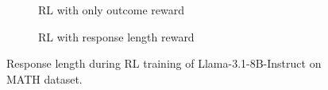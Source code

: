 \begin{figure}[h!]
    \centering
    \begin{subfigure}[b]{0.45\textwidth}
        \centering
        \caption{RL with only outcome reward}
        \label{fig:llama_wo_length_p}
    \end{subfigure}
    \hfill
    \begin{subfigure}[b]{0.45\textwidth}
        \centering
        \caption{RL with response length reward}
        \label{fig:llama_w_length_p}
    \end{subfigure}

 \caption{Response length during RL training of Llama-3.1-8B-Instruct on MATH dataset.}
 \label{fig:llama_response_len}
\end{figure}